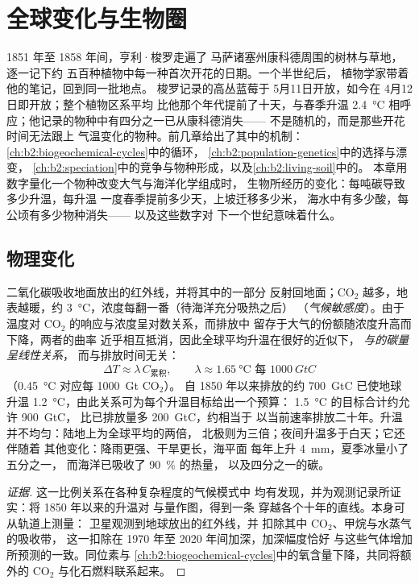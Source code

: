 \chapter{全球变化与生物圈}\label{ch:b2:global-change}

1851 年至 1858 年间，亨利·梭罗走遍了
马萨诸塞州康科德周围的树林与草地，逐一记下约
五百种植物中每一种首次开花的日期。一个半世纪后，
植物学家带着他的笔记，回到同一批地点。
梭罗记录的高丛蓝莓于 5月11日开放，如今在
4月12日即开放；整个植物区系平均
比他那个年代提前了十天，与春季升温 \qty{2.4}{\celsius}
相呼应；他记录的物种中有四分之一已从康科德消失——
不是随机的，而是那些开花时间无法跟上
气温变化的物种。前几章给出了其中的机制：
\cref{ch:b2:biogeochemical-cycles}中的循环，
\cref{ch:b2:population-genetics}中的选择与漂变，
\cref{ch:b2:speciation}中的竞争与物种形成，以及\cref{ch:b2:living-soil}中的。
本章用数字量化一个物种改变大气与海洋化学组成时，
生物所经历的变化：每吨碳导致多少升温，每升温
一度春季提前多少天，上坡迁移多少米，
海水中有多少酸，每公顷有多少物种消失——
以及这些数字对
下一个世纪意味着什么。

\section{物理变化}

\begin{proposition}[升温与累积排放成正比]\label{prop:b2:global-change:tcre}
二氧化碳吸收地面放出的红外线，并将其中的一部分
反射回地面；\ensuremath{\mathrm{CO_2}} 越多，地表越暖，约
\qty{3}{\celsius}，浓度每翻一番（待海洋充分吸热之后）
（\emph{气候敏感度}）。由于温度对
\ensuremath{\mathrm{CO_2}} 的响应与浓度呈对数关系，而排放中
留存于大气的份额随浓度升高而下降，两者的曲率
近乎相互抵消，因此全球平均升温在很好的近似下，
\emph{与的碳量呈线性关系}，
而与排放时间无关：
\[
\Delta T \approx \lambda\,C_{\text{累积}}, \qquad \lambda \approx
\qty{1.65}{\celsius} \text{ 每 } \qty{1000}{GtC}
\]
（\qty{0.45}{\celsius} 对应每 \qty{1000}{Gt} \ensuremath{\mathrm{CO_2}}）。
自 1850 年以来排放的约 \qty{700}{GtC} 已使地球
升温 \qty{1.2}{\celsius}，由此关系可为每个升温目标给出一个预算：
\qty{1.5}{\celsius} 的目标合计约允许 \qty{900}{GtC}，
比已排放量多 \qty{200}{GtC}，约相当于
以当前速率排放二十年。升温并不均匀：陆地上为全球平均的两倍，
北极则为三倍；夜间升温多于白天；它还伴随着
其他变化：降雨更强、干旱更长，海平面
每年上升 \qty{4}{mm}，夏季冰量小了五分之一，
而海洋已吸收了 \qty{90}{\%} 的热量，
以及四分之一的碳。
\end{proposition}
\begin{proof}[证据]
这一比例关系在各种复杂程度的气候模式中
均有发现，并为观测记录所证实：将 1850 年以来的升温对
与量作图，得到一条
穿越各个十年的直线。本身可从轨道上测量：
卫星观测到地球放出的红外线，并
扣除其中 \ensuremath{\mathrm{CO_2}}、甲烷与水蒸气的吸收带，
这一扣除在 1970 年至 2020 年间加深，加深幅度恰好
与这些气体增加所预测的一致。同位素与
\cref{ch:b2:biogeochemical-cycles}中的氧含量下降，共同将额外的
\ensuremath{\mathrm{CO_2}} 与化石燃料联系起来。
\end{proof}

